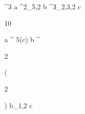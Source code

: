 \begin{eqcode}{\mu}{}{}{^3}
  a \in {}^2_{5,2} \lend
  b \in {}^3_{2,3,2} \lend
  c \gets
  \begin{tmatrix}
  10  \lend
  \end{tmatrix} \lend
  a \gets \genar \limits ^ {5}(c) \lend
  b \gets \genar \limits ^ {  \begin{tmatrix}
  2  \lend
  \end{tmatrix} }( \begin{tmatrix}
  2  \lend
  \end{tmatrix})  \lend
  b_{1,2} \gets  c \lend
   \lend
\end{eqcode}
